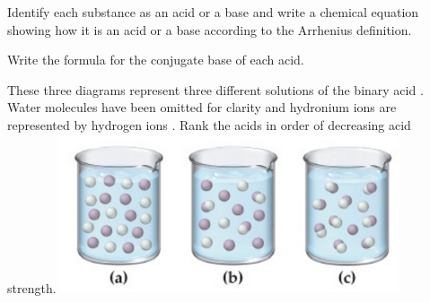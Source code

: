 \documentclass[addpoints,12pt]{exam}
\begin{document}
\begin{questions}
	\question[4]Identify each substance as an acid or a base and write a chemical equation showing how it is an acid or a base according to the Arrhenius definition.
\vspace{0.5in}
	\question[4] Write the formula for the conjugate base of each acid.
\vspace{1.0in}
	\question[1] These three diagrams represent three different solutions of the binary acid .  Water molecules have been omitted for clarity and hydronium ions  are represented by hydrogen ions .  Rank the acids in order of decreasing acid strength.
    \includegraphics[width=10cm]{3solns.png}
	

\end{questions}
\end{document}
